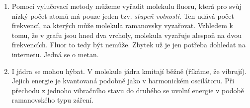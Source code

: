 \documentclass{../../../../style/mkimain}
\begin{document}
\noindent
{}
\klein
\begin{enumerate}
\item Pomocí vylučovací metody můžeme vyřadit molekulu fluoru,
    která pro svůj nízký počet atomů má pouze jeden tzv. \emph{stupeň volnosti}.
    Ten udává počet frekvencí, na kterých může molekula ramanovsky vyzařovat. Vzhledem k tomu, že v grafu jsou
    hned dva vrcholy, molekula vyzařuje alespoň na dvou frekvencích. Fluor to tedy být nemůže.
    Zbytek už je jen potřeba dohledat na internetu. Jedná se o metan.
\item I jádra se mohou hýbat. V molekule jádra kmitají běžně (říkáme, že vibrují). Jejich energie je kvantovaná podobně jako v harmonickém oscilátoru.
Při přechodu z jednoho vibračního stavu do druhého se uvolní energie v podobě ramanovského typu záření.
\end{enumerate}
\end{document}
